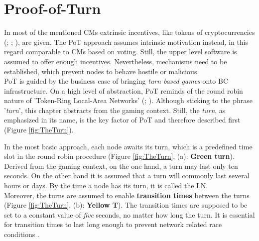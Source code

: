 
\chapter{Proof-of-Turn}
\label{chap:PoT}
In most of the mentioned \gls{CM}s extrinsic incentives, like tokens of cryptocurrencies
(\citet[4]{Butijn.2020}; \citet[3]{Khan.2020} \citet[85]{Kraft.2016}; \citet[4]{Nakamoto.2009}), are given.
The \gls{PoT} approach assumes intrinsic motivation instead, in this regard comparable to \gls{CM}s based on voting.
Still, the upper level software is assumed to offer enough incentives.
Nevertheless, mechanisms need to be established, which prevent nodes to behave hostile or malicious. \\
\gls{PoT} is guided by the business case of bringing \textit{turn based games} onto \gls{BC} infrastructure.
On a high level of abstraction, \gls{PoT} reminds of the round robin
nature of 'Token-Ring Local-Area Networks' (\citet{Bux.1989}; \citet{Ergen.2004}).
Although sticking to the phrase '\textit{turn}', this chapter abstracts from the gaming context.
Still, the \textit{turn}, as emphasized in its name, is the key factor of \gls{PoT} and therefore described first (Figure \ref{fig:TheTurn}).
\begin{figure}
\end{figure}
In the most basic approach, each node awaits its turn, which is a predefined time slot in the round robin procedure (Figure \ref{fig:TheTurn}, (a): \textbf{Green turn}).
Derived from the gaming context, on the one hand, a turn may last only ten seconds.
On the other hand it is assumed that a turn will commonly last several hours or days.
By the time a node has its turn, it is called the \gls{LN}. \\
Moreover, the turns are assumed to enable \textbf{transition times} between the turns (Figure \ref{fig:TheTurn}, (b): \textbf{Yellow T}).
The transition times are supposed to be set to a constant
value of \textit{five} seconds, no matter how long the turn.
It is essential for transition times to last long enough to prevent network related race conditions \cite[75]{NetzerR.H.B..1992}.
